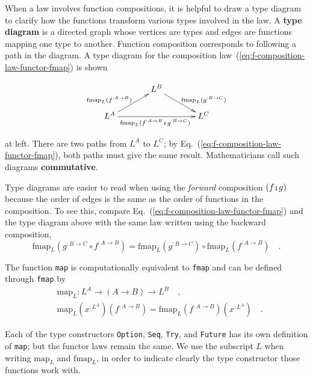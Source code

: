 When a law involves function compositions, it is helpful to draw a
type diagram to clarify how the functions transform
various types involved in the law. A \textbf{type diagram}
is a directed graph whose vertices are types and edges are functions
mapping one type to another. Function composition corresponds to following
a path in the diagram. A type diagram for the composition law~(\ref{eq:f-composition-law-functor-fmap})
is shown\begin{wrapfigure}{l}{0.4\columnwidth}%
\vspace{-1.9\baselineskip}
\[
\xymatrix{\xyScaleY{1.5pc}\xyScaleX{3pc} & L^{B}\ar[rd]\sp(0.6){~~\text{fmap}_{L}(g^{:B\rightarrow C})}\\
L^{A}\ar[ru]\sp(0.4){\text{fmap}_{L}(f^{:A\rightarrow B})\ ~}\ar[rr]\sb(0.5){\text{fmap}_{L}(f^{:A\rightarrow B}\bef g^{:B\rightarrow C})\ } &  & L^{C}
}
\]

\vspace{-2\baselineskip}
\end{wrapfigure}%
at left. There are two paths from $L^{A}$ to $L^{C}$; by Eq.~(\ref{eq:f-composition-law-functor-fmap}),
both paths must give the same result. Mathematicians call such diagrams
\textbf{commutative}.

Type diagrams are easier to read when using the \emph{forward} composition
$\left(f\bef g\right)$ because the order of edges is the same as
the order of functions in the composition. To see this, compare Eq.~(\ref{eq:f-composition-law-functor-fmap})
and the type diagram above with the same law written using the backward
composition,
\[
\text{fmap}_{L}(g^{:B\rightarrow C}\circ f^{:A\rightarrow B})=\text{fmap}_{L}(g^{:B\rightarrow C})\circ\text{fmap}_{L}(f^{:A\rightarrow B})\quad.
\]

The function \lstinline!map! is computationally equivalent to \lstinline!fmap!
and can be defined through \lstinline!fmap! by
\begin{align*}
 & \text{map}_{L}:L^{A}\rightarrow\left(A\rightarrow B\right)\rightarrow L^{B}\quad,\\
 & \text{map}_{L}(x^{:L^{A}})(f^{:A\rightarrow B})=\text{fmap}_{L}(f^{:A\rightarrow B})(x^{:L^{A}})\quad.
\end{align*}

Each of the type constructors \lstinline!Option!, \lstinline!Seq!,
\lstinline!Try!, and \lstinline!Future! has its own definition of
\lstinline!map!; but the functor laws remain the same. We use the
subscript $L$ when writing $\text{map}_{L}$ and $\text{fmap}_{L}$,
in order to indicate clearly the type constructor those functions
work with.

